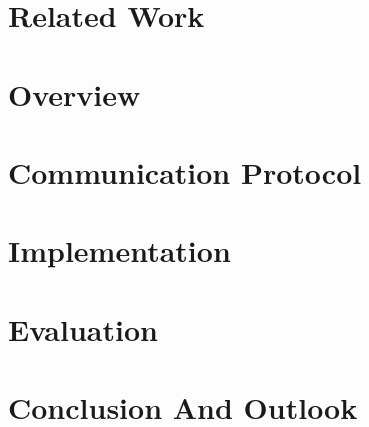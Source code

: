 \documentclass[
	paper=a4,
	fontsize=11pt,
	parskip=full %
]{scrreprt}
\begin{document}
    \chapter{Related Work}\label{ch:relatedwork}
    

    \chapter{Overview}\label{ch:overview}
    

    \chapter{Communication Protocol}\label{ch:protocol}
    

    \chapter{Implementation}\label{ch:implementation}
    

    \chapter{Evaluation}\label{ch:evaluation}
    

    \chapter{Conclusion And Outlook}\label{ch:conclusion}
    

    \printglossaries
	
    \printbibliography[heading=bibintoc]
\end{document}
